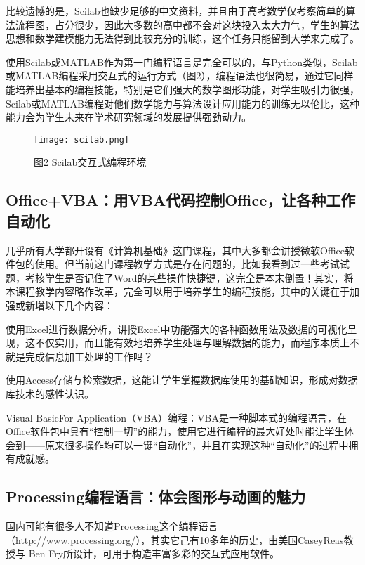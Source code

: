 比较遗憾的是，Scilab也缺少足够的中文资料，并且由于高考数学仅考察简单的算法流程图，占分很少，因此大多数的高中都不会对这块投入太大力气，学生的算法思想和数学建模能力无法得到比较充分的训练，这个任务只能留到大学来完成了。

使用Scilab或MATLAB作为第一门编程语言是完全可以的，与Python类似，Scilab或MATLAB编程采用交互式的运行方式（图2），编程语法也很简易，通过它同样能培养出基本的编程技能，特别是它们强大的数学图形功能，对学生吸引力很强，Scilab或MATLAB编程对他们数学能力与算法设计应用能力的训练无以伦比，这种能力会为学生未来在学术研究领域的发展提供强劲动力。

\begin{figure}[!h]
\centering
\texttt{[image: scilab.png]}
\caption{图2  Scilab交互式编程环境}
\label{scilab}
\end{figure}


\subsection{Office+VBA：用VBA代码控制Office，让各种工作自动化}

几乎所有大学都开设有《计算机基础》这门课程，其中大多都会讲授微软Office软件包的使用。但当前这门课程教学方式是存在问题的，比如我看到过一些考试试题，考核学生是否记住了Word的某些操作快捷键，这完全是本末倒置！其实，将本课程教学内容略作改革，完全可以用于培养学生的编程技能，其中的关键在于加强或新增以下几个内容：

\begin{compactenum}
\item 使用Excel进行数据分析，讲授Excel中功能强大的各种函数用法及数据的可视化呈现，这不仅实用，而且能有效地培养学生处理与理解数据的能力，而程序本质上不就是完成信息加工处理的工作吗？
\item 使用Access存储与检索数据，这能让学生掌握数据库使用的基础知识，形成对数据库技术的感性认识。
\item Visual BasicFor Application（VBA）编程：VBA是一种脚本式的编程语言，在Office软件包中具有“控制一切”的能力，使用它进行编程的最大好处时能让学生体会到——原来很多操作均可以一键“自动化”，并且在实现这种“自动化”的过程中拥有成就感。
\end{compactenum}

\subsection{Processing编程语言：体会图形与动画的魅力}

国内可能有很多人不知道Processing这个编程语言（http://www.processing.org/），其实它己有10多年的历史，由美国CaseyReas教授与 Ben Fry所设计，可用于构造丰富多彩的交互式应用软件。

